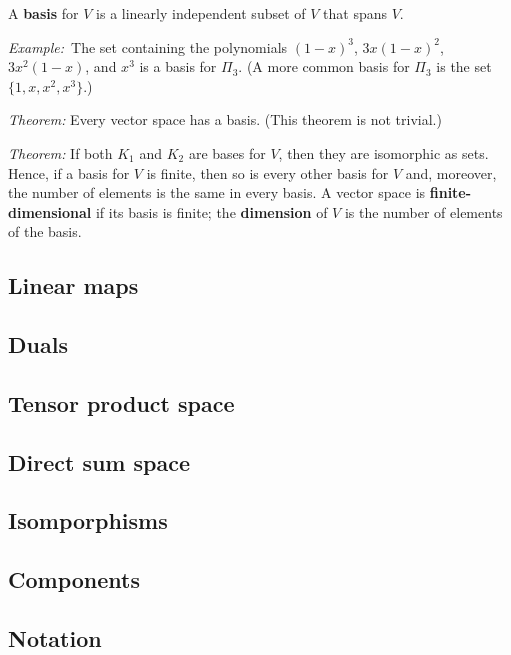 \documentclass[10pt, a4paper, twocolumn]{article}
\newcommand{\defn}[1]{\textbf{#1}}
\newcommand{\eg}{\emph{Example:}\relax}
\begin{document}
A \defn{basis} for $V$ is a linearly independent subset of $V$ that spans $V$. 

\eg\ The set containing the polynomials $(1-x)^3$, $3x(1-x)^2$, $3x^2(1-x)$, and $x^3$ is a
basis for $\Pi_3$. (A more common basis for $\Pi_3$ is the set $\{1, x, x^2, x^3\}$.) 

\emph{Theorem:} Every vector space has a basis. (This theorem is not trivial.)

\emph{Theorem:} If both $K_1$ and $K_2$ are bases for $V$, then they are
isomorphic as sets. Hence, if a basis for $V$ is finite, then so is every other
basis for $V$ and, moreover, the number of elements is the same in every
basis. A vector space is \defn{finite-dimensional} if its basis is finite; the
\defn{dimension} of $V$ is the number of elements of the basis.

\subsection{Linear maps}
\subsection{Duals}
\subsection{Tensor product space}
\subsection{Direct sum space}
\subsection{Isomporphisms}
\subsection{Components}
\subsection{Notation} 
\end{document}
